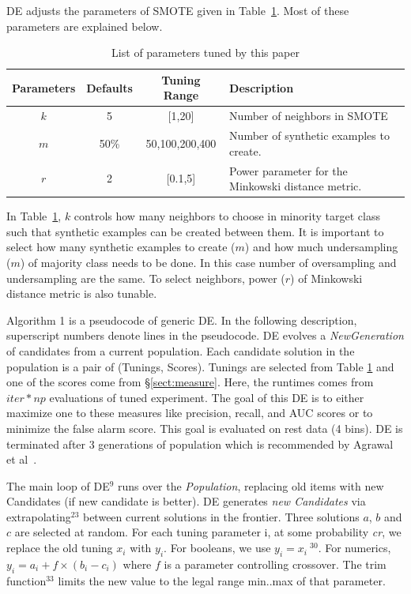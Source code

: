 \documentclass[sigconf,review, anonymous]{acmart}
\theoremstyle{break}
\theoremstyle{break}
\newcommand{\tion}[1]{{\S}\ref{sect:#1}}
\begin{document}
DE  adjusts the parameters of SMOTE given in
Table~\ref{tb:tuned}. Most of these parameters are explained below. 

\begin{table}[!htbp]
    \begin{center}
\scriptsize
\begin{tabular}{|c|c|c|p{3.5cm}|}
        \hline 
        \textbf{Parameters} & \textbf{Defaults} & \textbf{Tuning Range} & \textbf{Description}\\
        \hline
        $k$ & 5 & [1,20] & Number of neighbors in SMOTE \\ 
        \hline
       $m$ & 50\% & {50,100,200,400} & Number of synthetic examples to create. \\ 
        \hline
        $r$ & 2 & [0.1,5] & Power parameter for the Minkowski distance metric.\\

        \hline
\end{tabular}
\end{center}
\caption{List of parameters tuned by this paper}
\label{tb:tuned}
\end{table}
 
In Table~\ref{tb:tuned}, $k$ controls how many neighbors to choose in minority target class such that synthetic examples can be created between them. It is important to select how many synthetic examples to create ($m$) and how much undersampling ($m$) of majority class needs to be done. In this case number of oversampling and undersampling are the same. To select neighbors, power ($r$) of Minkowski distance metric is also tunable.

Algorithm 1 is a pseudocode of generic DE. In the following description,
superscript numbers denote lines in the pseudocode. DE evolves a \textit{NewGeneration} of
candidates from a current population.  Each candidate solution in the population is a pair of
(Tunings, Scores). Tunings are selected from Table \ref{tb:tuned} and one of the scores
come from \tion{measure}. Here, the runtimes comes from $\mathit{iter} * np $ evaluations of tuned experiment. The goal of this DE is to either maximize one to these measures like precision, recall, and AUC scores or to minimize the false alarm score. This goal is evaluated on rest data (4 bins). DE is terminated after 3 generations of population which is recommended by Agrawal et al~\cite{agrawal2016wrong}.

The main loop of DE$^{9}$ runs over the \textit{Population}, replacing old items with new Candidates (if new candidate is better).
DE generates \textit{new Candidates} via 
extrapolating$^{23}$ between current solutions in the frontier. Three solutions $a$, $b$ and $c$ are
selected at random. For each tuning parameter i, at some probability \textit{cr}, we
replace the old tuning $x_i$ with $y_i$. For booleans, we use $y_i = x_i\ ^{30}$. For numerics, $y_i = a_i + f \times (b_i - c_i)$ where $f$ is a
parameter controlling crossover. The trim function$^{33}$ limits the new value
to the legal range min..max of that parameter.
\end{document}
